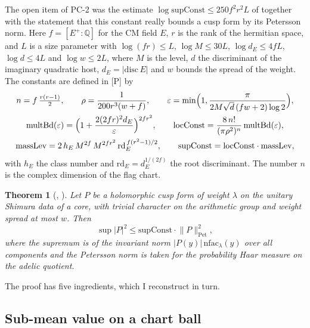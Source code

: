 \documentclass[11pt]{article}
\newcommand{\mP}{\textsf{[P]}}
\newtheorem{theorem}{Theorem}[section]
\theoremstyle{remark}
\begin{document}
The open item of PC-2 was the estimate $\log\mathrm{supConst}\le250f^2r^2L$ of  together with the statement  that this constant really bounds a cusp form by its Petersson norm. Here $f=[E^+:\mathbb Q]$ for the CM field $E$, $r$ is the rank of the hermitian space, and $L$ is a size parameter with $\log(fr)\le L$, $\log M\le30L$, $\log d_E\le4fL$, $\log d\le4L$ and $\log w\le2L$, where $M$ is the level, $d$ the discriminant of the imaginary quadratic host, $d_E=\lvert\mathrm{disc}\,E\rvert$ and $w$ bounds the spread of the weight. The constants are defined in  \mP{} by
\begin{gather*}
n=f\,\tfrac{r(r-1)}2,\qquad \rho=\frac1{200r^3(w+f)},\qquad
\varepsilon=\min\Bigl(1,\frac{\pi}{2M\sqrt d\,(fw+2)\log2}\Bigr),\\
\mathrm{multBd}(\varepsilon)=\Bigl(1+\frac{2(2fr)^2d_E}{\varepsilon}\Bigr)^{2fr^2},\qquad
\mathrm{locConst}=\frac{8\,n!}{(\pi\rho^2)^n}\,\mathrm{multBd}(\varepsilon),\\
\mathrm{massLev}=2\,h_E\,M^{2f}\,M^{2fr^2}\,\mathrm{rd}_E^{\,f(r^2-1)/2},\qquad
\mathrm{supConst}=\mathrm{locConst}\cdot\mathrm{massLev},
\end{gather*}
with $h_E$ the class number and $\mathrm{rd}_E=d_E^{1/(2f)}$ the root discriminant. The number $n$ is the complex dimension of the flag chart.

\begin{theorem}[, ]
Let $P$ be a holomorphic cusp form of weight $\lambda$ on the unitary Shimura data of a core, with trivial character on the arithmetic group and weight spread at most $w$. Then
\[
\sup\lvert P\rvert^2\le\mathrm{supConst}\cdot\lVert P\rVert_{\mathrm{Pet}}^2,
\]
where the supremum is of the invariant norm $\lvert P(y)\rvert\,\mathrm{nfac}_\lambda(y)$ over all components and the Petersson norm is taken for the probability Haar measure on the adelic quotient.
\end{theorem}

The proof has five ingredients, which I reconstruct in turn.

\subsection{Sub-mean value on a chart ball}
\end{document}
